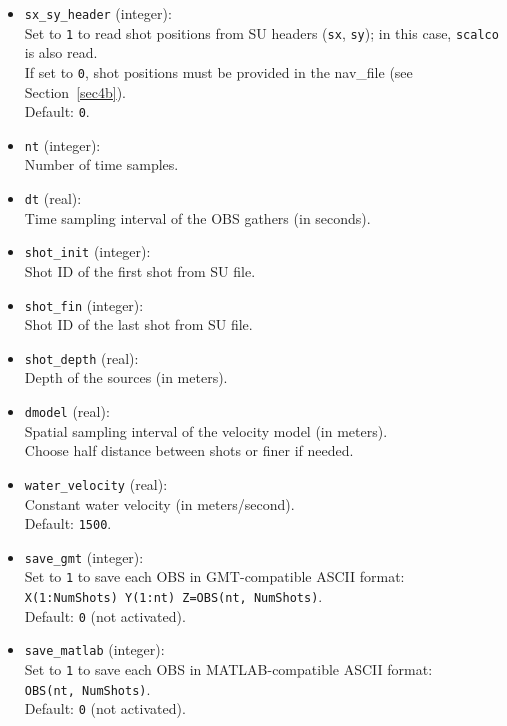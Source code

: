 \documentclass[11pt, oneside]{article}   	%
\begin{document}
\begin{itemize}
\item \texttt{sx\_sy\_header} (integer):\\
Set to \texttt{1} to read shot positions from SU headers (\texttt{sx}, \texttt{sy}); in this case, \texttt{scalco} is also read.\\
If set to \texttt{0}, shot positions must be provided in the nav\_file (see Section~\ref{sec4b}).\\
Default: \texttt{0}.


\item \texttt{nt} (integer):\\
Number of time samples.\\

\item \texttt{dt} (real):\\
Time sampling interval of the OBS gathers (in seconds).\\

\item \texttt{shot\_init} (integer):\\
Shot ID of the first shot from SU file.\\

\item \texttt{shot\_fin} (integer):\\
Shot ID of the last shot from SU file.\\

\item \texttt{shot\_depth} (real):\\
Depth of the sources (in meters).\\

\item \texttt{dmodel} (real):\\
Spatial sampling interval of the velocity model (in meters).\\
Choose half distance between shots or finer if needed.

\item \texttt{water\_velocity} (real):\\
Constant water velocity (in meters/second).\\
Default: \texttt{1500}.

\item \texttt{save\_gmt} (integer):\\
Set to \texttt{1} to save each OBS in GMT-compatible ASCII format:\\
\texttt{X(1:NumShots)  Y(1:nt)  Z=OBS(nt, NumShots)}.\\
Default: \texttt{0} (not activated).

\item \texttt{save\_matlab} (integer):\\
Set to \texttt{1} to save each OBS in MATLAB-compatible ASCII format:\\
\texttt{OBS(nt, NumShots)}.\\
Default: \texttt{0} (not activated).

\end{itemize}
\end{document}
